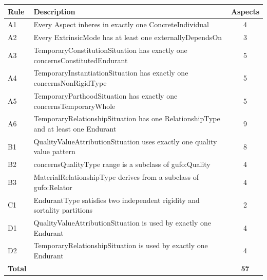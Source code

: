 \documentclass[12pt,a4paper]{article}
\begin{document}
\begin{longtable}{L{1.5cm}L{10cm}c}
  \toprule
  \textbf{Rule} & \textbf{Description} & \textbf{Aspects} \\
  \midrule
  \endhead
  A1 & Every Aspect inheres in exactly one ConcreteIndividual & 4 \\
  A2 & Every ExtrinsicMode has at least one externallyDependsOn & 3 \\
  A3 & TemporaryConstitutionSituation has exactly one concernsConstitutedEndurant & 5 \\
  A4 & TemporaryInstantiationSituation has exactly one concernsNonRigidType & 5 \\
  A5 & TemporaryParthoodSituation has exactly one concernsTemporaryWhole & 5 \\
  A6 & TemporaryRelationshipSituation has one RelationshipType and at least one Endurant & 9 \\
  B1 & QualityValueAttributionSituation uses exactly one quality value pattern & 8 \\
  B2 & concernsQualityType range is a subclass of gufo:Quality & 4 \\
  B3 & MaterialRelationshipType derives from a subclass of gufo:Relator & 4 \\
  C1 & EndurantType satisfies two independent rigidity and sortality partitions & 2 \\
  D1 & QualityValueAttributionSituation is used by exactly one Endurant & 4 \\
  D2 & TemporaryRelationshipSituation is used by exactly one Endurant & 4 \\
  \midrule
  \textbf{Total} & & \textbf{57} \\
  \bottomrule
\end{longtable}
\end{document}
